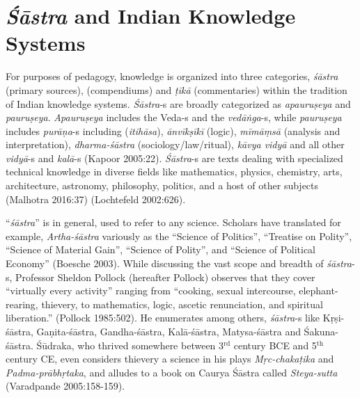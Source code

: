 \section*{{\sl\bfseries Śāstra} and Indian Knowledge Systems}

For purposes of pedagogy, knowledge is organized into three categories, {\sl śāstra} (primary sources), (compendiums) and {\sl ṭīkā} (commentaries) within the tradition of Indian knowledge systems. {\sl Śāstra}-s are broadly categorized as {\sl apauruṣeya} and {\sl pauruṣeya}. {\sl Apauruṣeya} includes the Veda-s and the {\sl vedāṅga}-s, while {\sl pauruṣeya} includes {\sl purāṇa}-s including ({\sl itihāsa}), {\sl ānvīkṣīkī} (logic), {\sl mīmāṃsā} (analysis and interpretation), {\sl dharma-śāstra} (sociology/law/ritual), {\sl kāvya vidyā} and all other {\sl vidyā}-s and {\sl kalā}-s (Kapoor 2005:22). {\sl Śāstra}-s are texts dealing with specialized technical knowledge in diverse fields like mathematics, physics, chemistry, arts, architecture, astronomy, philosophy, politics, and a host of other subjects (Malhotra 2016:37) (Lochtefeld 2002:626). 

``{\sl śāstra}'' is in general, used to refer to any science. Scholars have translated for example, {\sl Artha-śāstra} variously as the ``Science of Politics'', ``Treatise on Polity'', ``Science of Material Gain'', ``Science of Polity'', and ``Science of Political Economy'' (Boesche 2003). While discussing the vast scope and breadth of {\sl śāstra}-s, Professor Sheldon Pollock (hereafter Pollock) observes that they cover ``virtually every activity'' ranging from ``cooking, sexual intercourse, elephant-rearing, thievery, to mathematics, logic, ascetic renunciation, and spiritual liberation.'' (Pollock 1985:502). He enumerates among others, \hbox{{\sl śāstra}-s} like Kṛṣi-śāstra, Gaṇita-śāstra, Gandha-śāstra, Kalā-śāstra, Matysa-śāstra and Śakuna-śāstra. Śūdraka, who thrived somewhere between 3$^{\text{rd}}$ century BCE and 5$^{\text{th}}$ century CE, even considers thievery a science in his plays {\sl Mṛc-chakaṭika} and {\sl Padma-prābhṛtaka},  and alludes to a book on Caurya Śāstra called {\sl Steya-sutta} (Varadpande 2005:158-159).

